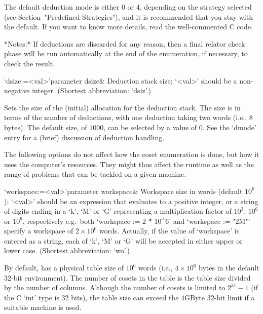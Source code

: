 \endlist

The  default deduction mode  is either  $0$ or  $4$, depending  on the
strategy  selected (see  Section~"Predefined Strategies"),  and  it is
recommended that you stay with the  default.  If you want to know more
details, read the well-commented C code.

*Notes:*
If deductions are discarded for any reason, then a final relator check
phase  will be run  automatically at  the end  of the  enumeration, if
necessary, to check the result.

\>`dsize:=<val>'{parameter dsize}&
Deduction stack size; `<val>' should be a non-negative integer.
(Shortest abbreviation: `dsiz'.)

Sets the  size of  the (initial) allocation  for the  deduction stack.
The size is  in terms of the number of  deductions, with one deduction
taking two words (i.e., 8 bytes).  The default size, of $1000$, can be
selected  by  a value  of  0.   See the  `dmode' entry  for a  (brief)
discussion of deduction handling.

\enditems


The following options do not affect how the coset enumeration is done,
but how it  uses the computer's resources. They  might thus affect the
runtime as  well as  the range of  problems that  can be tackled  on a
given machine.

\beginitems

\>`workspace:=<val>'{parameter workspace}&
Workspace size in words (default $10^6$);
`<val>' should be an expression that evaluates to a positive integer,
or a string of digits ending in a `k', `M' or `G' representing a
multiplication factor of $10^3$, $10^6$ or $10^9$, respectively
e.g.~both `workspace := 2 * 10^6' and `workspace := "2M"' specify
a workspace of $2\times10^6$ words. Actually, if the value of
`workspace' is entered as a string, each of `k', `M' or `G'
will be accepted in either upper or lower case.
(Shortest abbreviation: `wo'.)

By default, {\ACE} has a physical table size of $10^6$ words (i.e., $4
\times 10^6$ bytes in the  default 32-bit environment).  The number of
cosets  in the  table  is the  table  size divided  by  the number  of
columns.  Although the  number of cosets is limited  to $2^{31}-1$ (if
the C `int'  type is 32 bits), the table size  can exceed the $4$GByte
32-bit limit if a suitable machine is used.

